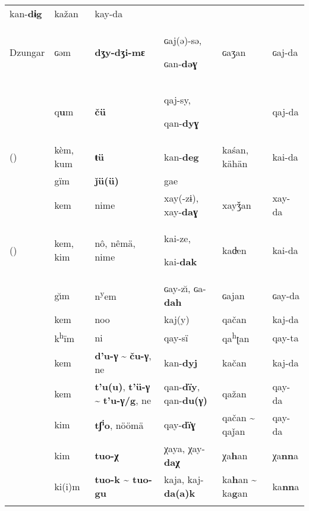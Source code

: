 \begin{table}
\begin{tabularx}{\textwidth}{>{\raggedright}p{15mm}lQQp{10mm}Q}
kan-\textbf{dɨg} & kažan & kay-da\\
Dzungar  & ɢəm & \textbf{dʒy-dʒi-mɛ} & ɢaj(ə)-sə,

{}ɢan-\textbf{dəɣ} & ɢaʒan & ɢaj-da\\
 & q\textbf{u}m & \textbf{čü} & qaj-sy,

qan-\textbf{dyɣ} &  & qaj-da\\
 () & kèm, kum & \textbf{ŧü} & kan-\textbf{deg} & kaśan, kähän & kai-da\\
 & gïm & \textbf{ǰü(ü)} & gae &  & \\
 & kem & nime & xay(-zɨ), xay-\textbf{daɣ} & xayǯan & xay-da\\
 () & kem, kim & nô, nêmä, nime & kai-ze,

kai-\textbf{dak} & ka{d̴}en & kai-da\\
 & g\u{\i}m & n\textsuperscript{y}em & ɢay-z\u{\i}, ɢa-\textbf{dah} & ɢajan & ɢay-da\\
 & kem & noo & kaj(y) & qačan & kaj-da\\
\mbox{} & k\textsuperscript{h}ïm & ni & qay-sï & qa\textsuperscript{h}ʈan & qay-ta\\
 & kem & \textbf{d’u-γ} {\textasciitilde} \textbf{ču-γ}, ne & kan-\textbf{dyj} & kačan & kaj-da\\
 & kem & \textbf{t’u(u)}, \textbf{t’ü-γ} {\textasciitilde} \textbf{t’u-γ/g}, ne & qan-\textbf{dïy}, qan-\textbf{du(γ)} & qažan & qay-da\\
 & kim & \textbf{tʃ\textsuperscript{i}}\textbf{o}, nöömä & qay-\textbf{dïɣ} & qačan {\textasciitilde} qaǰan & qay-da\\
 & kim & \textbf{tuo-}\textbf{χ} & χaya, χay-\textbf{daχ} & χa\textbf{h}an & χa\textbf{nn}a\\
 & ki(i)m & \textbf{tuo-k {\textasciitilde} tuo-gu} & kaja, kaj-\textbf{da(a)k} & ka\textbf{h}an {\textasciitilde} ka\textbf{g}an & ka\textbf{nn}a\\
\lspbottomrule
\end{tabularx}
\end{table}

